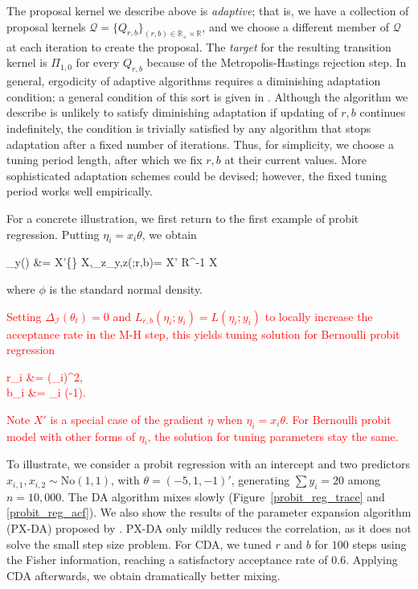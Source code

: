 \documentclass[11pt]{article}
\newcommand{\leo}[1]{{\textcolor{red}{#1}}}
\newcommand{\be}{\begin{equs}}
\newcommand{\ee}{\end{equs}}
\newcommand{\bb}[1]{\mathbb{#1}}
\newcommand{\mc}[1]{\mathcal{#1}}
\newcommand{\No}{\text{No}}
\newcommand{\diag}{\text{diag}}
\begin{document}

The proposal kernel we describe above is \emph{adaptive}; that is, we have a collection of proposal kernels $\mc Q = \{Q_{r,b}\}_{(r,b) \in \bb R_+ \times \bb R}$, and we choose a different member of $\mc Q$ at each iteration to create the proposal. The \emph{target} for the resulting transition kernel is $\Pi_{1,0}$ for every $Q_{r,b}$ because of the Metropolis-Hastings rejection step.  In general, ergodicity of adaptive algorithms requires a diminishing adaptation condition; a general condition of this sort is given in \cite{roberts2007coupling}. Although the algorithm we describe is unlikely to satisfy diminishing adaptation if updating of $r,b$ continues indefinitely, the condition is trivially satisfied by any algorithm that stops adaptation after a fixed number of iterations. Thus, for simplicity, we choose a tuning period length, after which we fix $r,b$ at their current values. More sophisticated adaptation schemes could be devised; however, the fixed tuning period works well empirically.


For a concrete illustration, we first return to the first example of probit regression. Putting $\eta_i = x_i\theta$, we obtain
\be
\mc I_{y\mid \theta}({\theta}) &=  X'\diag\bigg\{\bigg\} X,\qquad \bb E_{z\mid \theta}\mc I_{y\mid \theta,z}({\theta};r,b)= X' R^{-1} X
\ee
 where $\phi$ is the standard normal density. \leo{Setting $\Delta_{\mc I}(\theta_t)=0$ and $L_{r,b}(\eta_i;y_i)= L(\eta_i;y_i)
$ to locally increase the acceptance rate in the M-H step, this yields tuning solution
for Bernoulli probit regression
\be
r_i &= \frac{\Phi(\eta_i)(1- \Phi(\eta_i))} {\phi(\eta_i)^2},\\
b_i &= \eta_i (\sqrt{r_i}-1).
\ee
Note $X'$ is  a special case of the gradient $\dot\eta$ when $\eta_i = x_i\theta$. For Bernoulli probit model with other forms of $\eta_i$, the solution for tuning parameters stay the same.}


To illustrate, we consider a probit regression with an intercept and two predictors $x_{i,1},x_{i,2}\sim \No(1,1)$, with $\theta=(-5,1,-1)'$, generating $\sum y_i=20$ among $n=10,000$. The \cite{albert1993bayesian} DA algorithm mixes slowly (Figure~\ref{probit_reg_trace} and \ref{probit_reg_acf}). We also show the 
results of the parameter expansion algorithm (PX-DA) proposed by \cite{liu1999parameter}. PX-DA only mildly reduces the correlation, as it does not solve the small step size problem.  For CDA, we tuned $r$ and $b$ for $100$ steps using the Fisher information, reaching a satisfactory acceptance rate of $0.6$. Applying CDA afterwards, we obtain dramatically better mixing. 
\end{document}
